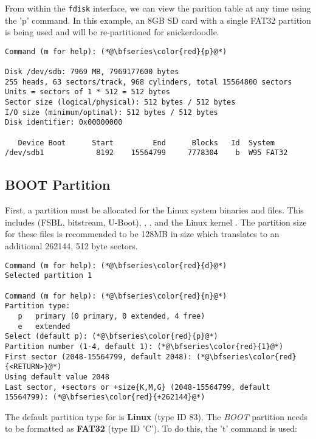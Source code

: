 
From within the \texttt{fdisk} interface, we can view the parition table at any time using the 'p' command. In this example, an 8GB SD card with a single FAT32 partition is being used and will be re-partitioned for snickerdoodle.


\begin{lstlisting}[style=text]
Command (m for help): (*@\bfseries\color{red}{p}@*)

Disk /dev/sdb: 7969 MB, 7969177600 bytes
255 heads, 63 sectors/track, 968 cylinders, total 15564800 sectors
Units = sectors of 1 * 512 = 512 bytes
Sector size (logical/physical): 512 bytes / 512 bytes
I/O size (minimum/optimal): 512 bytes / 512 bytes
Disk identifier: 0x00000000

   Device Boot      Start         End      Blocks   Id  System
/dev/sdb1            8192    15564799     7778304    b  W95 FAT32
\end{lstlisting}


\subsection{BOOT Partition}
First, a partition must be allocated for the Linux system binaries and files. This includes  (FSBL, bitstream, U-Boot), , , and the Linux kernel . The partition size for these files is recommended to be 128MB in size which translates to an additional 262144, 512 byte sectors.


\clearpage
\begin{lstlisting}[style=text]
Command (m for help): (*@\bfseries\color{red}{d}@*)
Selected partition 1

Command (m for help): (*@\bfseries\color{red}{n}@*)
Partition type:
   p   primary (0 primary, 0 extended, 4 free)
   e   extended
Select (default p): (*@\bfseries\color{red}{p}@*)
Partition number (1-4, default 1): (*@\bfseries\color{red}{1}@*)
First sector (2048-15564799, default 2048): (*@\bfseries\color{red}{<RETURN>}@*)
Using default value 2048
Last sector, +sectors or +size{K,M,G} (2048-15564799, default 15564799): (*@\bfseries\color{red}{+262144}@*)
\end{lstlisting}



The default partition type for  is \textbf{Linux} (type ID 83). The \textit{BOOT} partition needs to be formatted as \textbf{FAT32} (type ID 'C'). To do this, the 't' command is used:


